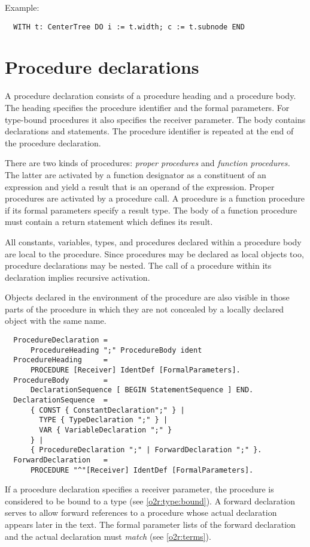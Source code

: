 \noindent
Example:
\begin{verbatim}
  WITH t: CenterTree DO i := t.width; c := t.subnode END
\end{verbatim}

\section{Procedure declarations}\label{o2r:proc:dcl}

A procedure declaration consists of a procedure heading and a procedure
body. The heading specifies the procedure identifier and the formal
parameters. For type-bound procedures it also specifies the receiver
parameter. The body contains declarations and statements. The procedure
identifier is repeated at the end of the procedure declaration.

There are two kinds of procedures: {\em proper procedures} and {\em function
procedures.} The latter are activated by a function designator as
a constituent of an expression and yield a result that is an operand
of the expression. Proper procedures are activated by a procedure
call. A procedure is a function procedure if its formal parameters
specify a result type. The body of a function procedure must contain
a return statement which defines its result.

All constants, variables, types, and procedures declared within a
procedure body are local to the procedure. Since procedures may be
declared as local objects too, procedure declarations may be nested.
The call of a procedure within its declaration implies recursive activation.

Objects declared in the environment of the procedure are also visible
in those parts of the procedure in which they are not concealed by
a locally declared object with the same name.
{\BNFsize
\begin{verbatim}
  ProcedureDeclaration =
      ProcedureHeading ";" ProcedureBody ident
  ProcedureHeading     =
      PROCEDURE [Receiver] IdentDef [FormalParameters].
  ProcedureBody        =
      DeclarationSequence [ BEGIN StatementSequence ] END.
  DeclarationSequence  =
      { CONST { ConstantDeclaration";" } |
        TYPE { TypeDeclaration ";" } |
        VAR { VariableDeclaration ";" }
      } |
      { ProcedureDeclaration ";" | ForwardDeclaration ";" }.
  ForwardDeclaration   =
      PROCEDURE "^"[Receiver] IdentDef [FormalParameters].
\end{verbatim}}
If a procedure declaration specifies a receiver parameter, the procedure
is considered to be bound to a type (see \ref{o2r:type:bound}).
A forward declaration serves to allow forward references to a procedure
whose actual declaration appears later in the text. The formal parameter
lists of the forward declaration and the actual declaration must {\em match}
(see \ref{o2r:terms}).

